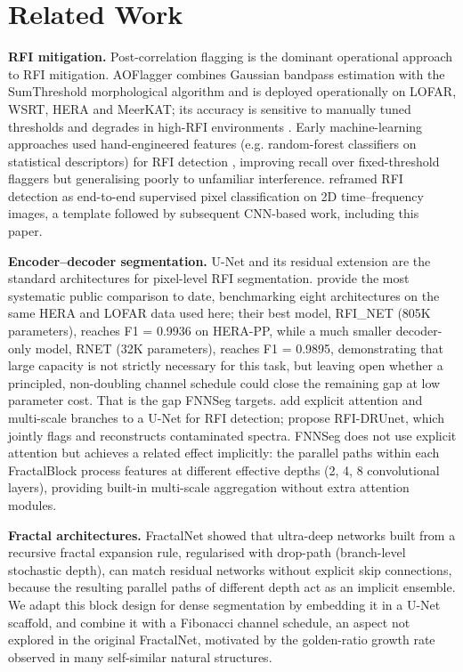 \documentclass[11pt]{article}
\begin{document}
\section{Related Work}

\textbf{RFI mitigation.} Post-correlation flagging is the dominant operational approach to RFI mitigation. AOFlagger \citep{offringa2012} combines Gaussian bandpass estimation with the SumThreshold morphological algorithm and is deployed operationally on LOFAR, WSRT, HERA and MeerKAT; its accuracy is sensitive to manually tuned thresholds and degrades in high-RFI environments \citep{offringa2010,baan2004}. Early machine-learning approaches used hand-engineered features (e.g. random-forest classifiers on statistical descriptors) for RFI detection \citep{mosiane2016}, improving recall over fixed-threshold flaggers but generalising poorly to unfamiliar interference. \citet{vafaeisadr2020} reframed RFI detection as end-to-end supervised pixel classification on 2D time--frequency images, a template followed by subsequent CNN-based work, including this paper.

\textbf{Encoder--decoder segmentation.} U-Net \citep{ronneberger2015} and its residual extension \citep{he2016} are the standard architectures for pixel-level RFI segmentation. \citet{dutoit2023} provide the most systematic public comparison to date, benchmarking eight architectures on the same HERA and LOFAR data used here; their best model, RFI\_NET (805K parameters), reaches F1 = 0.9936 on HERA-PP, while a much smaller decoder-only model, RNET (32K parameters), reaches F1 = 0.9895, demonstrating that large capacity is not strictly necessary for this task, but leaving open whether a principled, non-doubling channel schedule could close the remaining gap at low parameter cost. That is the gap FNNSeg targets. \citet{gu2024} add explicit attention and multi-scale branches to a U-Net for RFI detection; \citet{zhang2024} propose RFI-DRUnet, which jointly flags and reconstructs contaminated spectra. FNNSeg does not use explicit attention but achieves a related effect implicitly: the parallel paths within each FractalBlock process features at different effective depths (2, 4, 8 convolutional layers), providing built-in multi-scale aggregation without extra attention modules.

\textbf{Fractal architectures.} FractalNet \citep{larsson2017} showed that ultra-deep networks built from a recursive fractal expansion rule, regularised with drop-path (branch-level stochastic depth), can match residual networks without explicit skip connections, because the resulting parallel paths of different depth act as an implicit ensemble. We adapt this block design for dense segmentation by embedding it in a U-Net scaffold, and combine it with a Fibonacci channel schedule, an aspect not explored in the original FractalNet, motivated by the golden-ratio growth rate observed in many self-similar natural structures.
\end{document}
